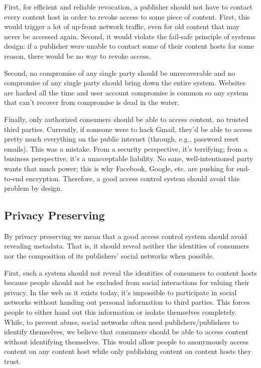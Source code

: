 \documentclass[pdftex,12pt,a4papaer]{report}
\begin{document}
First, for efficient and reliable revocation, a publisher should not have to
contact every content host in order to revoke access to some piece of content.
First, this would trigger a lot of up-front network traffic, even for old
content that may never be accessed again. Second, it would violate the fail-safe
principle of systems design: if a publisher were unable to contact some of their
content hosts for some reason, there would be no way to revoke access.

Second, no compromise of any single party should be unrecoverable and no
compromise of any single party should bring down the entire system. Websites are
hacked all the time and user account compromise is common so any system that
can't recover from compromise is dead in the water.

Finally, only authorized consumers should be able to access content, no trusted
third parties. Currently, if someone were to hack Gmail, they'd be able to
access pretty much everything on the public internet (through, e.g., password
reset emails). This was a mistake. From a security perspective, it's terrifying;
from a business perspective, it's a unacceptable liability. No sane,
well-intentioned party wants that much power; this is why Facebook, Google, etc.
are pushing for end-to-end encryption. Therefore, a good access control system
should avoid this problem by design.

\subsection{Privacy Preserving}

By privacy preserving we mean that a good access control system should avoid
revealing metadata. That is, it should reveal neither the identities of
consumers nor the composition of its publishers' social networks when possible.

First, such a system should not reveal the identities of consumers to content
hosts because people should not be excluded from social interactions for valuing
their privacy. In the web as it exists today, it's impossible to participate in
social networks without handing out personal information to third parties. This
forces people to either hand out this information or isolate themselves
completely. While, to prevent abuse, social networks often need
publishers/publishers to identify themselves, we believe that consumers should
be able to access content without identifying themselves. This would allow
people to anonymously access content on any content host while only publishing
content on content hosts they trust.
\end{document}
